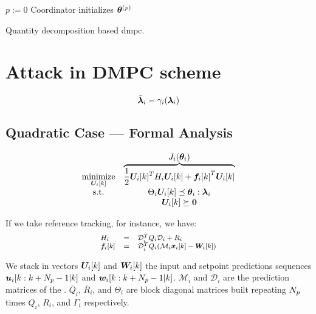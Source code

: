 \documentclass{ifacconf}  %
\begin{document}
\begin{algorithm2e}[h]
  \DontPrintSemicolon%
  $p:=0$\;
  Coordinator initializes $\boldsymbol{\theta}^{(p)}$ \;
 \caption{Quantity decomposition based \acrlong{dmpc}.}\label{alg:quantityAlg}
\end{algorithm2e}

\section{Attack in DMPC scheme}\label{sec:attack}

\begin{equation}\label{eq:cheating}
\tilde{\boldsymbol{\lambda}}_i=\gamma_{i}(\boldsymbol{\lambda}_i)
\end{equation}

\subsection{Quadratic Case --- Formal Analysis}\label{ssec:FA}

\begin{equation}
\begin{matrix}
\underset{\Uik}{\mathrm{minimize}}& \overbrace{\frac{1}{2} \Uik^T H_i\Uik+{\fik}^T\Uik}^{\textstyle J_{i}(\vec{\theta}_{i})}\\
\mathrm{s.t.}&\Theta_{i}\Uik\preceq\vec{\theta}_{i}:\vec{\lambda}_{i}\\
&\Uik\succeq\0
\end{matrix}
\label{eq:quadratic_case}
\end{equation}

If we take reference tracking, for instance, we have:
\begin{equation}
\small\begin{matrix*}[l]
 H_i&=&\mathcal{D}_i^T\bar{Q}_i\mathcal{D}_i+\bar{R}_i\\
\fik&=&\mathcal{D}_i^T\bar{Q}_i(\mathcal{M}_i\xik-\Wik)\\

\end{matrix*}
\label{eq:matrices}
\end{equation}

We stack in vectors $\Uik$ and $\Wik$
the input and setpoint predictions sequences ${\uiseq}$ and ${\wiseq}$.
${\mathcal{M}_{i}}$  and ${\mathcal{D}_{i}}$ are the prediction matrices of the \mpc{}.
$\bar{Q}_{i}$, $\bar{R}_{i}$, and $\Theta_{i}$ are block diagonal matrices built repeating $N_{p}$ times $Q_{i}$, $R_{i}$, and $\Gamma_i$ respectively.
\end{document}
